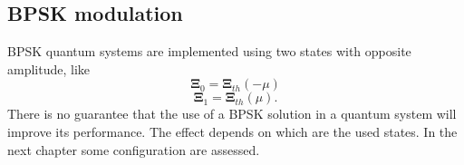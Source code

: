     \subsection{BPSK modulation}
        BPSK quantum systems are implemented using two states with opposite amplitude, like
        \begin{equation}
            \pmb{\Xi}_0 = \pmb{\Xi}_{th}(-\mu)
            \label{eq:2.1.2}
        \end{equation}
        \begin{equation*}
            \pmb{\Xi}_1 = \pmb{\Xi}_{th}(\mu).
        \end{equation*}
        There is no guarantee that the use of a BPSK solution in  a quantum system will 
        improve its performance. The effect depends on which are the used states. In the next chapter some 
        configuration are assessed.
